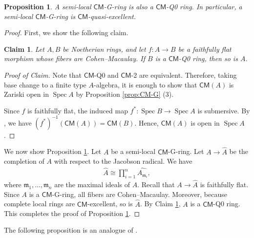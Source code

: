 \documentclass[a4paper, 11pt]{amsart}
\newtheorem{proposition}[theorem]{Proposition}
\newtheorem{claim}[theorem]{Claim}
\theoremstyle{definition}
\newenvironment{pfclaim}
    {\renewcommand{\qedsymbol}{$\Diamond$}\begin{proof}[Proof of Claim]}
    {\end{proof}}
\newcommand{\Spec}{\operatorname{Spec}}
\renewcommand{\hat}[1]{\widehat{#1}}
\begin{document}
\begin{proposition}\label{prop:semilocalCMG}
    A semi-local $\mathsf{CM}$\textnormal{-G-}ring is also a $\mathsf{CM}$\textnormal{-Q0} ring. In particular, a semi-local $\mathsf{CM}$\textnormal{-G-}ring is $\mathsf{CM}$-quasi-excellent.
\end{proposition}
\begin{proof}
    First, we show the following claim. 
    \begin{claim}\label{claim:claimCMG}
        Let $A, B$ be Noetherian rings, and let $f \colon A \to B$ be a faithfully flat morphism whose fibers are Cohen--Macaulay. If $B$ is a $\mathsf{CM}$\textnormal{-Q0} ring, then so is $A$.
    \end{claim}
    \begin{pfclaim}
        Note that $\mathsf{CM}$-Q0 and $\mathsf{CM}$-2 are equivalent. Therefore, taking base change to a finite type $A$-algebra, it is enough to show that $\mathsf{CM}(A)$ is Zariski open in $\Spec A$ by Proposition \ref{prop:CM-G} (3).

        Since $f$ is faithfully flat, the induced map $f^* \colon \Spec B \to \Spec A$ is submersive. By \cite[Corollary (21.E) iii)]{Mat70}, we have $(f^*)^{-1}(\mathsf{CM}(A)) = \mathsf{CM}(B)$. Hence, $\mathsf{CM}(A)$ is open in $\Spec A$.
    \end{pfclaim}
    We now show Proposition \ref{prop:semilocalCMG}. Let $A$ be a semi-local $\mathsf{CM}$-G-ring. Let $A \to \hat{A}$ be the completion of $A$ with respect to the Jacobson radical. We have
    \begin{align*}
        \hat{A} \cong \prod_{i=1}^n \hat{A_{\mathfrak{m}_i}},
    \end{align*}
    where $\mathfrak{m}_1, \ldots, \mathfrak{m}_n$ are the maximal ideals of $A$. Recall that $A \to \hat{A}$ is faithfully flat. Since $A$ is a $\mathsf{CM}$-G-ring, all fibers are Cohen--Macaulay. Moreover, because complete local rings are $\mathsf{CM}$-excellent, so is $\hat{A}$. By Claim \ref{claim:claimCMG}, $A$ is a $\mathsf{CM}$-Q0 ring. This completes the proof of Proposition \ref{prop:semilocalCMG}. 
\end{proof}

The following proposition is an analogue of \cite[Theorem 3.1]{Gre76}. 
\end{document}
